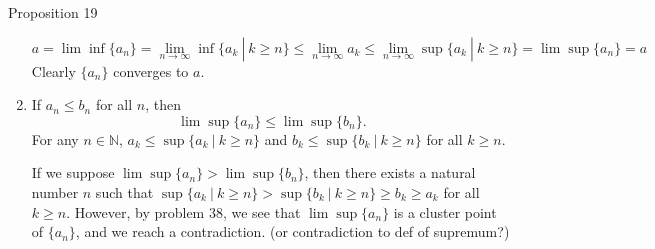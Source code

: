 \begin{flushleft}
\begin{namedthm*}{Proposition 19}
\begin{enumerate}[label=(\roman*),align=left]
	\[a= \lim \inf \{a_n \} = \lim_{n \to \infty} \inf \{ a_k\ |\ k \ge n\} \le \lim_{n \to \infty} a_k \le \lim_{n \to \infty} \sup \{ a_k\ |\ k \ge n\}= \lim \sup \{a_n \} = a\]
	Clearly $\{ a_n\}$ converges to $a$.
	\item If $a_n \le b_n$ for all $n$, then
	\[
		\lim \sup \{a_n \} \le \lim \sup \{b_n \}.	
	\]
	For any $n \in \mathbb{N}$, $a_k \le \sup \{ a_k\ |\ k \ge n\}$ and $b_k \le \sup \{ b_k\ |\ k \ge n\} $ for all $k \ge n$.\par
	If we suppose $\lim \sup \{a_n \} > \lim \sup \{b_n \}$, then there exists a natural number $n$ such that $\sup \{ a_k\ |\ k \ge n\} > \sup \{ b_k\ |\ k \ge n\} \ge b_k \ge a_k$ for all $k \ge n$.
	However, by problem 38, we see that $\lim \sup \{a_n \}$ is a cluster point of $\{a_n \}$, and we reach a contradiction. (or contradiction to def of supremum?)
\end{enumerate}	
\end{namedthm*}


\end{flushleft}
